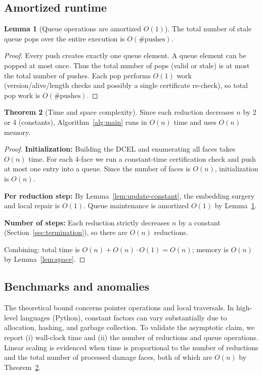 \documentclass[12pt]{article}
\theoremstyle{definition}
\newtheorem{theorem}{Theorem}
\newtheorem{lemma}[theorem]{Lemma}
\begin{document}
\subsection{Amortized runtime}
\label{subsec:amortized}

\begin{lemma}[Queue operations are amortized $O(1)$]
\label{lem:queue-amortized}
The total number of stale queue pops over the entire execution is $O(\#\text{pushes})$.
\end{lemma}
\begin{proof}
Every push creates exactly one queue element. A queue element can be popped at most once.
Thus the total number of pops (valid or stale) is at most the total number of pushes.
Each pop performs $O(1)$ work (version/alive/length checks and possibly a single certificate re-check), so total pop work
is $O(\#\text{pushes})$.
\end{proof}

\begin{theorem}[Time and space complexity]
\label{thm:linear}
Since each reduction decreases $n$ by 2 or 4 (constants),
Algorithm~\ref{alg:main} runs in $O(n)$ time and uses $O(n)$ memory.
\end{theorem}
\begin{proof}
\textbf{Initialization:} Building the DCEL and enumerating all faces takes $O(n)$ time.
For each 4-face we run a constant-time certification check and push at most one entry into a queue.
Since the number of faces is $O(n)$, initialization is $O(n)$.

\textbf{Per reduction step:} By Lemma~\ref{lem:update-constant}, the embedding surgery and local repair is $O(1)$.
Queue maintenance is amortized $O(1)$ by Lemma~\ref{lem:queue-amortized}.

\textbf{Number of steps:} Each reduction strictly decreases $n$ by a constant (Section~\ref{sec:termination}),
so there are $O(n)$ reductions.

Combining: total time is $O(n) + O(n)\cdot O(1)=O(n)$; memory is $O(n)$ by Lemma~\ref{lem:space}.
\end{proof}

\subsection{Benchmarks and anomalies}
\label{subsec:benchmarks-notes}
The theoretical bound concerns pointer operations and local traversals. In high-level languages (Python),
constant factors can vary substantially due to allocation, hashing, and garbage collection.
To validate the asymptotic claim, we report (i) wall-clock time and (ii) the number of reductions and queue operations.
Linear scaling is evidenced when time is proportional to the number of reductions and the total number of processed
damage faces, both of which are $O(n)$ by Theorem~\ref{thm:linear}.
\end{document}
